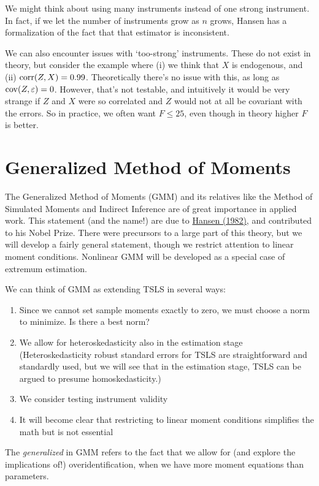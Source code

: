 \documentclass[10pt]{article}
\begin{document}
\begin{remark}
	We might think about using many instruments instead of one strong instrument. In fact, if we let the number of instruments grow as $n$ grows, Hansen has a formalization of the fact that that estimator is inconsistent.
\end{remark}

\begin{remark}
	We can also encounter issues with `too-strong' instruments. These do not exist in theory, but consider the example where (i) we think that $X$ is endogenous, and (ii) $\mathop{\rm corr}(Z,X) = 0.99$. Theoretically there's no issue with this, as long as $\mathop{\rm cov}(Z,\varepsilon) = 0$. However, that's not testable, and intuitively it would be very strange if $Z$ and $X$ were so correlated and $Z$ would not at all be covariant with the errors. So in practice, we often want $F \le 25$, even though in theory higher $F$ is better.
\end{remark}

\newpage
\section{Generalized Method of Moments}

The Generalized Method of Moments (GMM) and its relatives like the Method of Simulated Moments and Indirect Inference are of great importance in applied work. This statement (and the name!) are due to \href{https://www.jstor.org/stable/1912775}{Hansen (1982)}, and contributed to his Nobel Prize. There were precursors to a large part of this theory, but we will develop a fairly general statement, though we restrict attention to linear moment conditions. Nonlinear GMM will be developed as a special case of extremum estimation.

We can think of GMM as extending TSLS in several ways:
\begin{enumerate}
	\item Since we cannot set sample moments exactly to zero, we must choose a norm to minimize. Is there a best norm?
	\item We allow for heteroskedasticity also in the estimation stage (Heteroskedasticity robust standard errors for TSLS are straightforward and standardly used, but we will see that in the estimation stage, TSLS can be argued to presume homoskedasticity.)
	\item We consider testing instrument validity
	\item It will become clear that restricting to linear moment conditions simplifies the math but is not essential
\end{enumerate}
\begin{remark}
	The \emph{generalized} in GMM refers to the fact that we allow for (and explore the implications of!) overidentification, when we have more moment equations than parameters.
\end{remark}
\end{document}
